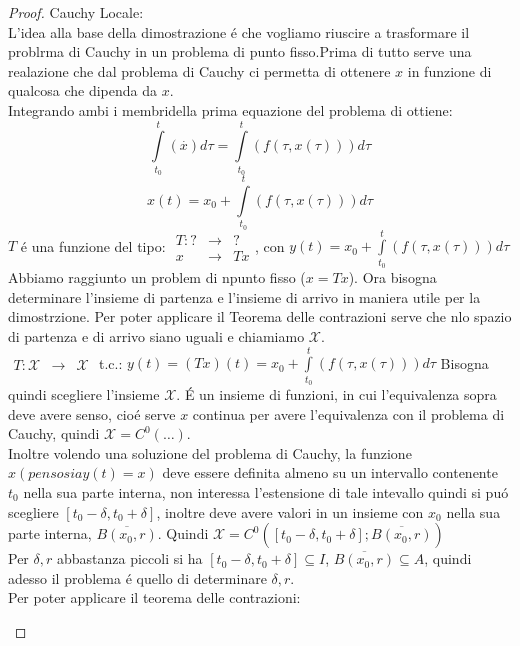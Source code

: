 \begin{proof}
	Cauchy Locale:\\
	L'idea alla base della dimostrazione \'e che vogliamo riuscire a trasformare il problrma di Cauchy in un problema di punto fisso.Prima di tutto serve una realazione che dal problema di Cauchy ci permetta di ottenere $x$ in funzione di qualcosa che dipenda da $x$.\\
	Integrando ambi i membridella prima equazione del problema di ottiene:
	$$\int\limits_{t_0}^t(\overset{\cdot}{x})d\tau=\int\limits_{t_0}^t(f(\tau,x(\tau)))d\tau$$
	$$x(t)=x_0+\int\limits_{t_0}^t(f(\tau,x(\tau)))d\tau$$
	$T$ \'e una funzione del tipo:
	$\begin{array}{rcl} T: ? & \to & ? \\ x & \to & Tx \end{array}$, con $y(t)=x_0+\int\limits_{t_0}^t(f(\tau,x(\tau)))d\tau$\\
	Abbiamo raggiunto un problem di npunto fisso ($x=Tx$). Ora bisogna determinare l'insieme di partenza e l'insieme di arrivo in maniera utile per la dimostrzione. Per poter applicare il Teorema delle contrazioni serve che nlo spazio di partenza e di arrivo siano uguali e chiamiamo $\mathcal{X}$.\\
	$\begin{array}{rcl} T: \mathcal{X} & \to & \mathcal{X} \end{array}$ t.c.: $y(t)=(Tx)(t)=x_0+\int\limits_{t_0}^t(f(\tau,x(\tau)))d\tau$
	Bisogna quindi scegliere l'insieme $\mathcal{X}$. \'E un insieme di funzioni, in cui l'equivalenza sopra deve avere senso, cio\'e serve $x$ continua per avere l'equivalenza con il problema di Cauchy, quindi $\mathcal{X}=C^0(\ldots)$.\\
	Inoltre volendo una soluzione del problema di Cauchy, la funzione $x(penso sia y(t)=x)$ deve essere definita almeno su un intervallo contenente $t_0$ nella sua parte interna, non interessa l'estensione di tale intevallo quindi si pu\'o scegliere $\left[t_0-\delta,t_0+\delta\right]$, inoltre deve avere valori in un insieme con $x_0$ nella sua parte interna, $\overline{B(x_0,r)}$. Quindi $\mathcal{X}=C^0(\left[t_0-\delta,t_0+\delta\right];\overline{B(x_0,r)})$\\
	Per $\delta, r$ abbastanza piccoli si ha $\left[t_0-\delta,t_0+\delta\right]\subseteq I$, $\overline{B(x_0,r)}\subseteq A$, quindi adesso il problema \'e quello di determinare $\delta, r$.\\
	Per poter applicare il teorema delle contrazioni:
	\begin{description}

\end{description}
\end{proof}
